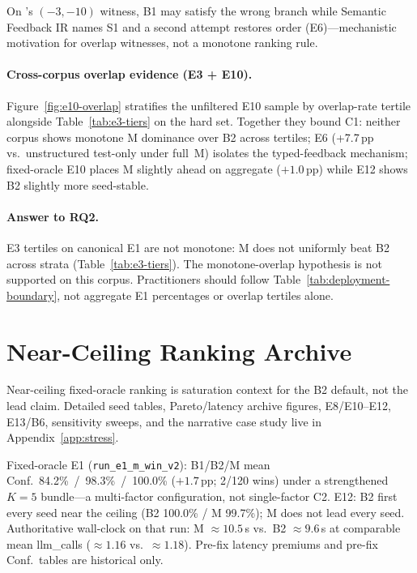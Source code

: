 On 's $(-3,-10)$ witness, B1 may satisfy the wrong
branch while Semantic Feedback IR names S1 and a second attempt restores order
(E6)---mechanistic motivation for overlap witnesses, not a monotone ranking
rule.

\paragraph{Cross-corpus overlap evidence (E3 + E10).}
Figure~\ref{fig:e10-overlap} stratifies the unfiltered E10 sample by
overlap-rate tertile alongside Table~\ref{tab:e3-tiers} on the hard set.
Together they bound C1: neither corpus shows monotone M dominance over B2
across tertiles; E6 (+7.7\,pp vs.\ unstructured test-only under full~M)
isolates the typed-feedback mechanism; fixed-oracle E10 places M slightly
ahead on aggregate (${+}1.0$\,pp) while E12 shows B2 slightly more
seed-stable.

\paragraph{Answer to RQ2.}
E3 tertiles on canonical E1 are not monotone: M does not uniformly beat B2
across strata (Table~\ref{tab:e3-tiers}).
The monotone-overlap hypothesis is not supported on this corpus.
Practitioners should follow Table~\ref{tab:deployment-boundary}, not aggregate
E1 percentages or overlap tertiles alone.

\section{Near-Ceiling Ranking Archive}
\label{sec:results:rq5}
\label{sec:results:e1-stress}

Near-ceiling fixed-oracle ranking is saturation context for the B2 default,
not the lead claim.
Detailed seed tables, Pareto/latency archive figures, E8/E10--E12, E13/B6,
sensitivity sweeps, and the  narrative case study live in
Appendix~\ref{app:stress}.

Fixed-oracle E1 (\texttt{run\_e1\_m\_win\_v2}): B1/B2/M mean Conf.\
84.2\%~/~98.3\%~/~100.0\% (${+}1.7$\,pp; 2/120 wins) under a strengthened
$K{=}5$ bundle---a multi-factor configuration, not single-factor C2.
E12: B2 first every seed near the ceiling (B2 100.0\% / M 99.7\%); M does
not lead every seed.
Authoritative wall-clock on that run: M ${\approx}10.5$\,s vs.\ B2
${\approx}9.6$\,s at comparable mean llm\_calls (${\approx}1.16$ vs.\
${\approx}1.18$).
Pre-fix latency premiums and pre-fix Conf.\ tables are historical only.


